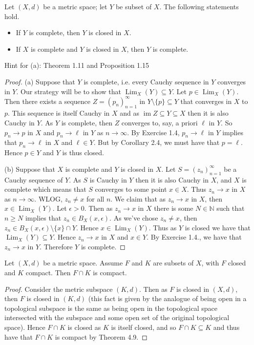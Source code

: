 \documentclass[10pt,reqno]{amsart}
\theoremstyle{definition}
\DeclareMathOperator{\im}{im}
\DeclareMathOperator{\Lim}{Lim}
\newcommand{\nn}{\mathbb N}
\begin{document}
\begin{tcolorbox}[colback=black!5!white,colframe=black!75!black,title= Chapter 4: Exercise $2.4.$] Let $(X,d)$ be a metric space; let $Y$ be subset of $X$. The following statements hold. 

\begin{itemize}
	\item [(a)] If $Y$ is complete, then $Y$ is closed in $X$.
	\item [(b)] If $X$ is complete and $Y$ is closed in $X$, then $Y$ is complete. 
\end{itemize}
Hint for (a): Theorem 1.11 and Proposition 1.15
\tcblower 
\begin{proof} (a) Suppose that $Y$ is complete, i.e. every Cauchy sequence in $Y$ converges in $Y$. Our strategy will be to show that $\Lim_X(Y) \subseteq Y$. Let $p \in \Lim_X(Y)$. Then there exists a sequence $Z = (p_n)_{n=1} ^\infty$ in $Y\setminus \{ p \} \subseteq Y$ that converges in $X$ to $p$. This sequence is itself Cauchy in $X$ and as $\im Z \subseteq Y \subseteq X$ then it is also Cauchy in $Y$. As $Y$ is complete, then $Z$ converges to, say, a priori $\ell $ in $Y$. So $p_n \to p$ in $X$ and $p_n \to \ell $ in $Y$ as $n \to \infty$. By Exercise 1.4, $p_n \to \ell$ in $Y$ implies that $p_n \to \ell$ in $X$ and $\ell \in Y$. But by Corollary 2.4, we must have that $p = \ell$. Hence $p \in Y$ and $Y$ is thus closed.

(b) Suppose that $X$ is complete and $Y$ is closed in $X$. Let $S = (z_n)_{n=1}^\infty$ be a Cauchy sequence of $Y$. As $S$ is Cauchy in $Y$ then it is also Cauchy in $X$, and $X$ is complete which means that $S$ converges to some point $x \in X$. Thus $z_n \to x$ in $X$ as $n \to \infty$. WLOG, $z_n \neq x$ for all $n$. We claim that as $z_n \to x$ in $X$, then $x \in \Lim_X (Y)$. Let $\epsilon > 0$. Then as $z_n \to x$ in $X$ there is some $N \in \nn$ such that $n \geq N$ implies that $z_n \in B_X(x, \epsilon)$. As we've chose $z_n \neq x$, then $z_n \in B_X(x,\epsilon)\setminus \{ x \} \cap Y $. Hence $x \in \Lim_X(Y)$. Thus as $Y$ is closed we have that $\Lim_X (Y) \subseteq Y$. Hence $z_n \to x$ in $X$ and $x \in Y$. By Exercise 1.4., we have that $z_n \to x$ in $Y$. Therefore $Y$ is complete. 
\end{proof}

\end{tcolorbox}
\begin{tcolorbox}[colback=black!5!white,colframe=black!75!black,title= Chapter 4: Exercise $4.1.$] Let $(X,d)$ be a metric space. Assume $F$ and $K$ are subsets of $X$, with $F$ closed and $K$ compact. Then $F \cap K$ is compact. 
\tcblower 
\begin{proof} Consider the metric subspace $(K,d)$. Then as $F$ is closed in $(X, d)$, then $F$ is closed in $(K,d)$ (this fact is given by the analogue of being open in a topological subspace is the same as being open in the topological space intersected with the subspace and some open set of the original topological space). Hence $F \cap K$ is closed as $K$ is itself closed, and so $F \cap K \subseteq K$ and thus have that $F \cap K$ is compact by Theorem 4.9.
\end{proof}

\end{tcolorbox}
\end{document}

